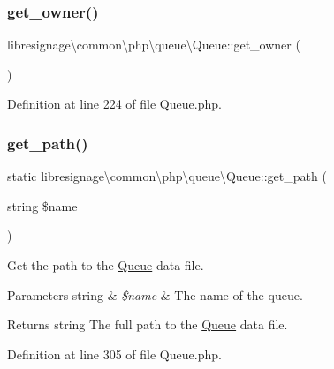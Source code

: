 \subsubsection{\texorpdfstring{get\+\_\+owner()}{get\_owner()}}
{\footnotesize\ttfamily libresignage\textbackslash{}common\textbackslash{}php\textbackslash{}queue\textbackslash{}\+Queue\+::get\+\_\+owner (\begin{DoxyParamCaption}{ }\end{DoxyParamCaption})}



Definition at line 224 of file Queue.\+php.

\mbox{\label{classlibresignage_1_1common_1_1php_1_1queue_1_1Queue_adbee76308f559c7c68f36f6f16bb5bf7}} 
\subsubsection{\texorpdfstring{get\+\_\+path()}{get\_path()}}
{\footnotesize\ttfamily static libresignage\textbackslash{}common\textbackslash{}php\textbackslash{}queue\textbackslash{}\+Queue\+::get\+\_\+path (\begin{DoxyParamCaption}\item[{string}]{\$name }\end{DoxyParamCaption})\hspace{0.3cm}{\ttfamily [static]}}

Get the path to the \hyperlink{classlibresignage_1_1common_1_1php_1_1queue_1_1Queue}{Queue} data file.


\begin{DoxyParams}[1]{Parameters}
string & {\em \$name} & The name of the queue.\\
\hline
\end{DoxyParams}
\begin{DoxyReturn}{Returns}
string The full path to the \hyperlink{classlibresignage_1_1common_1_1php_1_1queue_1_1Queue}{Queue} data file. 
\end{DoxyReturn}


Definition at line 305 of file Queue.\+php.

\mbox{\label{classlibresignage_1_1common_1_1php_1_1queue_1_1Queue_ae09cbc15368b9e5dd7b58b9d29f189e8}} 
